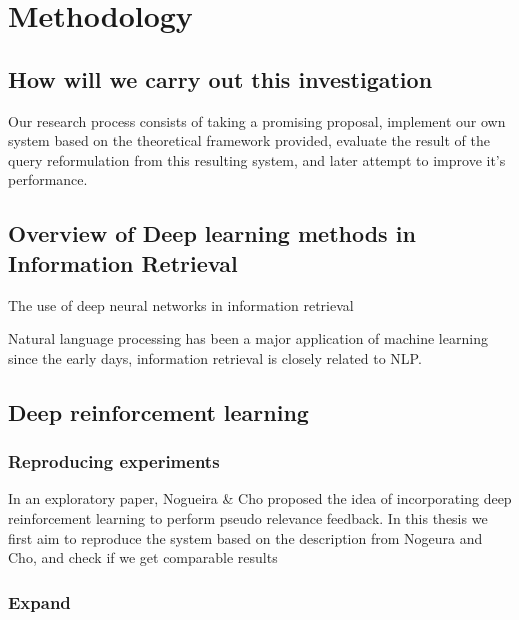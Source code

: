 
\chapter{Methodology}
\label{chap:new_ideas}


\section{How will we carry out this investigation}

Our research process consists of taking a promising proposal, implement our own system based on the theoretical framework provided, evaluate the result of the query reformulation from this resulting system, and later attempt to improve it's performance.



\section{Overview of Deep learning methods in Information Retrieval}

The use of deep neural networks in information retrieval 

Natural language processing has been a major application of machine learning since the early days, information retrieval is closely related to NLP.






\section{Deep reinforcement learning }



\subsection{Reproducing experiments}

In an exploratory paper, Nogueira \& Cho\cite{nogueira2017task} proposed the idea of incorporating deep reinforcement learning to perform pseudo relevance feedback.  In this thesis we first aim to reproduce the system based on the description from Nogeura and Cho, and check if we get comparable results 




\subsection{Expand}




